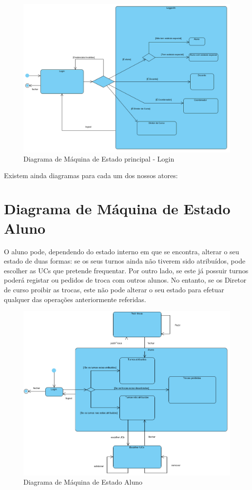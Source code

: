 \documentclass[12pt,a4paper]{report}
\begin{document}
\paragraph{}
\begin{figure}[H]
	\centering 
	\includegraphics[width=\textwidth]{modelacao/diagramas_maq_estado/main_maq_estado.png}  
	\caption{Diagrama de Máquina de Estado principal - Login}
\end{figure}
Existem ainda diagramas para cada um dos nossos atores:

\section{Diagrama de Máquina de Estado Aluno}
     O aluno pode, dependendo do estado interno em que se encontra, alterar o seu estado de duas formas: se os seus turnos ainda não tiverem sido atribuídos, pode escolher as UCs que pretende frequentar. Por outro lado, se este já possuir turnos poderá registar ou pedidos de troca com outros alunos.
     No entanto, se os Diretor de curso proibir as trocas, este não pode alterar o seu estado para efetuar qualquer das operações anteriormente referidas.
    \begin{figure}[H]
	\centering 
	\includegraphics[width=\textwidth]{modelacao/diagramas_maq_estado/aluno_maq_estado.png}  
	\caption{Diagrama de Máquina de Estado Aluno}
    \end{figure}
\pagebreak
\end{document}
